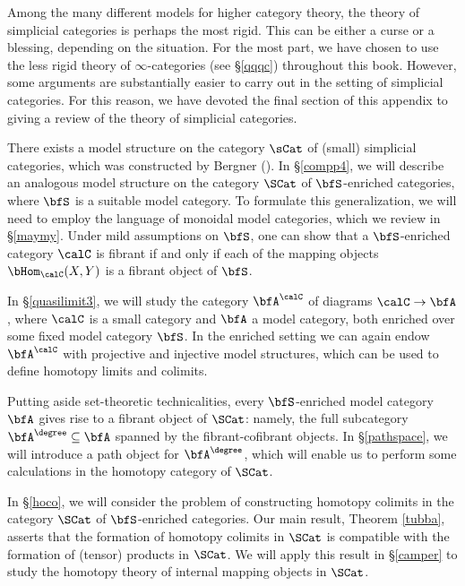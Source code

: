 \begin{Simplicial Categories}
Among the many different models for higher category theory, the theory of simplicial categories
is perhaps the most rigid. This can be either a curse or a blessing, depending on the situation. 
For the most part, we have chosen to use the less rigid theory of $\infty$-categories (see \S \ref{qqqc}) throughout this book. However, some arguments are substantially easier to carry out in the setting of simplicial categories. For this reason, we have devoted the final section of this appendix to giving a review of the theory of simplicial categories.

There exists a model structure on the category $\sCat$ of (small) simplicial categories, which was constructed by Bergner (\cite{bergner}). In \S \ref{compp4}, we will describe an analogous model structure on the category $\SCat$ of $\bfS$-enriched categories, where $\bfS$ is a suitable model category.
To formulate this generalization, we will need to employ the language of monoidal model categories, which we review in \S \ref{maymy}. Under mild assumptions on $\bfS$, one can show that a $\bfS$-enriched
category $\calC$ is fibrant if and only if each of the mapping objects $\bHom_{\calC}(X,Y)$ is a fibrant object of $\bfS$.

In \S \ref{quasilimit3}, we will study the category $\bfA^{\calC}$ of diagrams $\calC \rightarrow \bfA$, where
$\calC$ is a small category and $\bfA$ a model category, both enriched over some
fixed model category $\bfS$. In the enriched setting we can again endow $\bfA^{\calC}$
with projective and injective model structures, which can be used to define homotopy limits and
colimits. 

Putting aside set-theoretic technicalities, every $\bfS$-enriched model category $\bfA$
gives rise to a fibrant object of $\SCat$: namely, the full subcategory
$\bfA^{\degree} \subseteq \bfA$ spanned by the fibrant-cofibrant objects. In \S \ref{pathspace}, we
will introduce a path object for $\bfA^{\degree}$, which will enable us to perform some calculations in
the homotopy category of $\SCat$. 

In \S \ref{hoco}, we will consider the problem of constructing homotopy colimits in
the category $\SCat$ of $\bfS$-enriched categories. Our main result, Theorem \ref{tubba}, asserts
that the formation of homotopy colimits in $\SCat$ is compatible with the formation of
(tensor) products in $\SCat$. We will apply this result in \S \ref{camper} to study the homotopy
theory of internal mapping objects in $\SCat$. 


\end{Simplicial Categories}
